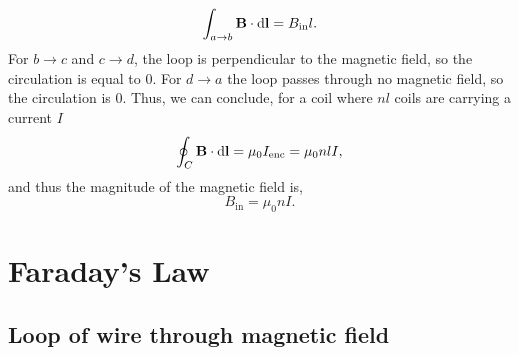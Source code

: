 \documentclass{book}
\begin{document}
\begin{equation}
    \int_{a\to b}\vb{B}\cdot\dd{\vb{l}} = B_{\text{in}}l.
\end{equation}
For $b\to c$ and $c \to d$, the loop is perpendicular to the magnetic field, so the circulation is equal to 0. For $d \to a$ the loop passes through no magnetic field, so the circulation is 0. Thus, we can conclude, for a coil where $nl$ coils are carrying a current $I$
\begin{equation}
    \oint_C \vb{B}\cdot \dd{\vb{l}} = \mu_0 I_{\text{enc}} = \mu_0 nlI,
\end{equation}
and thus the magnitude of the magnetic field is,
\begin{equation}
    B_{\text{in}} = \mu_0 n I.
\end{equation}
\section{Faraday's Law}
\subsection{Loop of wire through magnetic field}
\end{document}
